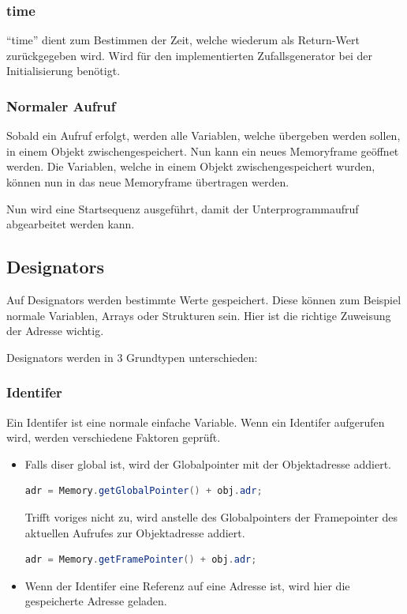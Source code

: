 \subsubsection{time}
``time'' dient zum Bestimmen der Zeit, welche wiederum als Return-Wert zurückgegeben wird. Wird für den implementierten Zufallsgenerator bei der Initialisierung benötigt.

\subsubsection{Normaler Aufruf}
Sobald ein Aufruf erfolgt, werden alle Variablen, welche übergeben werden sollen, in einem Objekt zwischengespeichert. Nun kann ein
neues Memoryframe geöffnet werden. Die Variablen, welche in einem Objekt zwischengespeichert wurden, können nun in das neue
Memoryframe übertragen werden.

Nun wird eine Startsequenz ausgeführt, damit der Unterprogrammaufruf abgearbeitet werden kann.

\subsection{Designators}
Auf Designators werden bestimmte Werte gespeichert. Diese können zum Beispiel normale Variablen, Arrays oder Strukturen sein. Hier ist die richtige Zuweisung der Adresse wichtig.

Designators werden in 3 Grundtypen unterschieden:
\subsubsection{Identifer}
Ein Identifer ist eine normale einfache Variable. Wenn ein Identifer aufgerufen wird, werden verschiedene Faktoren geprüft.
\begin{itemize}
 \item Falls diser global ist, wird der Globalpointer mit der Objektadresse addiert.
 \begin{lstlisting}[language=JAVA]
 adr = Memory.getGlobalPointer() + obj.adr;	
  \end{lstlisting}
  Trifft voriges nicht zu, wird anstelle des Globalpointers der Framepointer des aktuellen Aufrufes zur Objektadresse addiert.
   \begin{lstlisting}[language=JAVA]
 adr = Memory.getFramePointer() + obj.adr;
  \end{lstlisting}
 \item Wenn der Identifer eine Referenz auf eine Adresse ist, wird hier die gespeicherte Adresse geladen.
\end{itemize}




